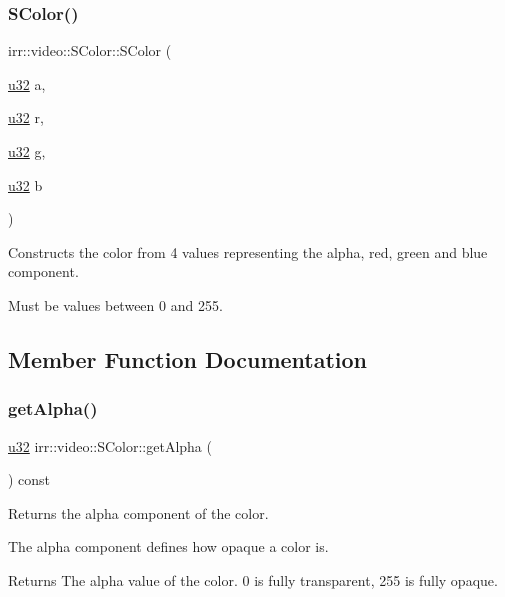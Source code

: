 \subsubsection{\texorpdfstring{S\+Color()}{SColor()}\hspace{0.1cm}{\footnotesize\ttfamily [2/2]}}
{\footnotesize\ttfamily irr\+::video\+::\+S\+Color\+::\+S\+Color (\begin{DoxyParamCaption}\item[{\hyperlink{namespaceirr_a0416a53257075833e7002efd0a18e804}{u32}}]{a,  }\item[{\hyperlink{namespaceirr_a0416a53257075833e7002efd0a18e804}{u32}}]{r,  }\item[{\hyperlink{namespaceirr_a0416a53257075833e7002efd0a18e804}{u32}}]{g,  }\item[{\hyperlink{namespaceirr_a0416a53257075833e7002efd0a18e804}{u32}}]{b }\end{DoxyParamCaption})\hspace{0.3cm}{\ttfamily [inline]}}



Constructs the color from 4 values representing the alpha, red, green and blue component. 

Must be values between 0 and 255. 

\subsection{Member Function Documentation}
\mbox{\label{classirr_1_1video_1_1SColor_a8b0bcff9036b06e3483978a84a924b91}} 
\subsubsection{\texorpdfstring{get\+Alpha()}{getAlpha()}}
{\footnotesize\ttfamily \hyperlink{namespaceirr_a0416a53257075833e7002efd0a18e804}{u32} irr\+::video\+::\+S\+Color\+::get\+Alpha (\begin{DoxyParamCaption}{ }\end{DoxyParamCaption}) const\hspace{0.3cm}{\ttfamily [inline]}}



Returns the alpha component of the color. 

The alpha component defines how opaque a color is. \begin{DoxyReturn}{Returns}
The alpha value of the color. 0 is fully transparent, 255 is fully opaque. 
\end{DoxyReturn}
\mbox{\label{classirr_1_1video_1_1SColor_afb60ac456b2efc2f2a4f04a643293d26}} 
